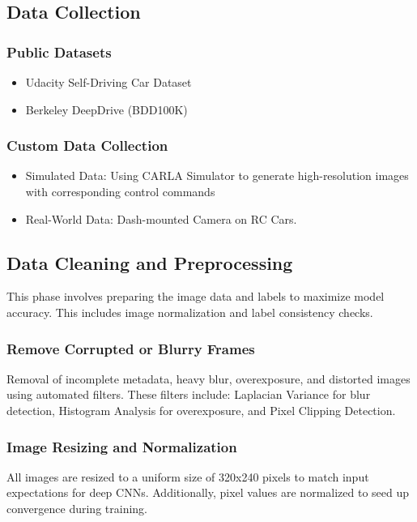 \documentclass{article} %
\begin{document}
\subsection{Data Collection}

\subsubsection{Public Datasets}
\begin{itemize}
  \item Udacity Self-Driving Car Dataset \citep{udacity_self_driving_car_2021}
  \item Berkeley DeepDrive (BDD100K) \citep{bdd100k_2018}
\end{itemize}

\subsubsection{Custom Data Collection}
\begin{itemize}
  \item Simulated Data: Using CARLA Simulator to generate high-resolution images with corresponding control commands \citep{Dosovitskiy17}
  \item Real-World Data: Dash-mounted Camera on RC Cars.
\end{itemize}


\subsection{Data Cleaning and Preprocessing}

This phase involves preparing the image data and labels to maximize model accuracy. 
This includes image normalization and label consistency checks.

\subsubsection{Remove Corrupted or Blurry Frames}
Removal of incomplete metadata, heavy blur, overexposure, and distorted images using automated filters.
These filters include: Laplacian Variance for blur detection, Histogram Analysis for overexposure, 
and Pixel Clipping Detection.


\subsubsection{Image Resizing and Normalization}
All images are resized to a uniform size of 320x240 pixels to match input expectations for deep CNNs. Additionally, 
pixel values are normalized to seed up convergence during training.
\end{document}
